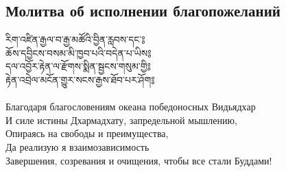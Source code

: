 \subsection{Молитва об исполнении благопожеланий}
\vspace{0.5cm}
\ti
རིག་འཛིན་རྒྱལ་བ་རྒྱ་མཚོའི་བྱིན་རླབས་དང་༔\\
ཆོས་དབྱིངས་བསམ་མི་ཁྱབ་པའི་བདེན་པ་ཡིས༔\\
དལ་འབྱོར་རྟེན་ལ་རྫོགས་སྨིན་སྦྱངས་གསུམ་གྱི༔\\
རྟེན་འབྲེལ་མངོན་གྱུར་སངས་རྒྱས་ཐོབ་པར་ཤོག༔\\
\\
\ru
Благодаря благословениям океана победоносных Видьядхар\\
И силе истины Дхармадхату, запредельной мышлению,\\
Опираясь на свободы и преимущества,\\
Да реализую я взаимозависимость\\
Завершения, созревания и очищения, чтобы все стали Буддами!\\
